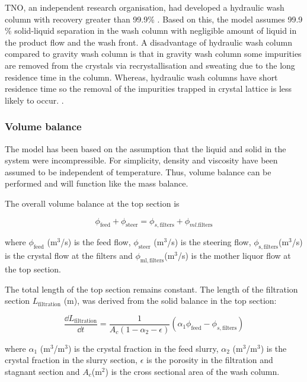 TNO, an independent research organisation, had developed a hydraulic wash column with recovery greater than 99.9\% \cite{noauthor_melt_nodate}. Based on this, the model assumes 99.9 \% solid-liquid separation in the wash column with negligible amount of liquid in the product flow and the wash front. A disadvantage of hydraulic wash column compared to gravity wash column  is that in gravity wash column some impurities are removed from the crystals via recrystallisation and sweating due to the long residence time in the column. Whereas, hydraulic wash columns have short residence time so the removal of the impurities trapped in crystal lattice is less likely to occur.   \cite{van_oord-knol_hydraulic_2000}.

\subsubsection{Volume balance} 
The model has been based on the assumption that the liquid and solid in the system were incompressible. For simplicity, density and viscosity have been assumed to be independent of temperature. Thus, volume balance can be performed and will function like the mass balance. 

The overall volume balance at the top section is

\begin{equation}
\phi_{\mathrm{feed}}+\phi_{\mathrm{steer}}=\phi_{s,\mathrm{filters}}+\phi_{ml.\mathrm{filters}}
\end{equation}

\noindent where $\phi_{\mathrm{feed}}$ (m$^{3}$/s) is the feed flow, $\phi_{\mathrm{steer}}$ (m$^{3}$/s) is the steering flow, $\phi_{\mathrm{s,filters}} $(m$^{3}$/s) is the crystal flow at the filters and $\phi_{\mathrm{ml,filters}} $(m$^{3}$/s) is the mother liquor flow at the top section.

The total length of the top section remains constant. The length of the filtration section $ L_{\mathrm{filtration}}$ (m), was derived from the solid balance in the top section: 

\begin{equation}
\frac{\dd L_{\mathrm{filtration}}}{\dd t} = \frac{1}{A_c(1-\alpha_2-\epsilon)}(\alpha_1\phi_{\mathrm{feed}}-\phi_{s,\mathrm{filters}})
\end{equation}

\noindent where $\alpha_1$ (m$^3$/m$^3$) is the crystal fraction in the feed slurry, $\alpha_2$ (m$^3$/m$^3$) is the crystal fraction in the slurry section, $\epsilon$ is the porosity in the filtration and stagnant section and $A_c $(m$^2$) is the cross sectional area of the wash column.

